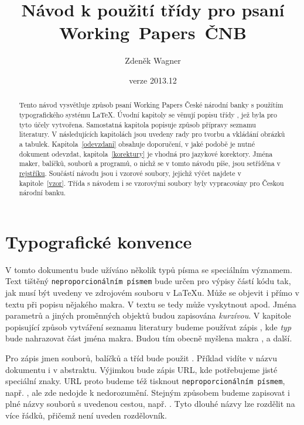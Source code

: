 \documentclass[12pt]{article}
\title{Návod k použití třídy \fn{cnbwp} pro psaní Working~Papers~ČNB}
\author{Zdeněk Wagner}\date{verze 2013.12}
\begin{document}
\maketitle

\begin{abstract}\noindent
Tento návod vysvětluje způsob psaní Working Papers České národní banky s použítím typografického
systému \LaTeX. Úvodní kapitoly se věnují popisu třídy , jež byla pro tyto účely
vytvořena. Samostatná kapitola popisuje způsob přípravy seznamu literatury. V následujících
kapitolách jsou uvedeny rady pro tvorbu a vkládání obrázků a tabulek. Kapitola~\ref{odevzdani}
obsahuje doporučení, v jaké podobě je nutné dokument odevzdat, kapitola~\ref{korektury} je vhodná
pro jazykové korektory. Jména maker, balíčků, souborů a programů, o nichž se v tomto návodu píše,
jsou setříděna v \hyperref[index]{rejstříku}. Součástí návodu jsou i vzorové soubory, jejichž výčet
najdete v kapitole~\ref{vzor}.
Třída s návodem i se vzorovými soubory byly vypracovány pro Českou národní banku.
\end{abstract}

\tableofcontents

\section{Typografické konvence}\label{typokon}
V tomto dokumentu bude užíváno několik typů písma se speciálním významem. Text tištěný
\texttt{neproporcionálním písmem} bude určen pro výpisy částí kódu tak, jak musí být uvedeny ve
zdrojovém souboru v \LaTeX{}u. Může se objevit i přímo v textu při popisu nějakého makra. V textu
se tedy může vyskytnout  apod. Jména parametrů a jiných proměnných objektů budou
zapisována \textit{kurzívou}. V kapitole popisující způsob vytváření seznamu literatury budeme
používat zápis \bibi, kde \textit{typ} bude nahrazovat část jména makra. Budou tím obecně myšlena
makra ,  a další.

Pro zápis jmen souborů, balíčků a tříd bude použit . Příklad vidíte v názvu
dokumentu i v abstraktu. Výjimkou bude zápis URL, kde potřebujeme jisté speciální znaky. URL proto
budeme též tisknout \texttt{neproporcionálním písmem}, např.
, ale zde nedojde k nedorozumění. Stejným způsobem budeme
zapisovat i plné názvy souborů s uvedenou cestou, např.
. Tyto dlouhé názvy lze rozdělit na více
řádků, přičemž není uveden rozdělovník.
\end{document}
